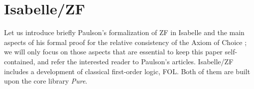 \section{Isabelle/ZF}\label{sec:isabellezf}

Let us introduce briefly Paulson's formalization of ZF
\cite{paulson2017isabelle} in Isabelle and the main aspects of his
formal proof for the relative consistency of the Axiom of Choice
\cite{paulson_2003}; we will only focus on those aspects that are
essential to keep this paper self-contained, and refer the interested
reader to Paulson's articles.
Isabelle/ZF includes a development of classical first-order logic,
FOL. Both of them are  built upon the core library \emph{Pure}. 

